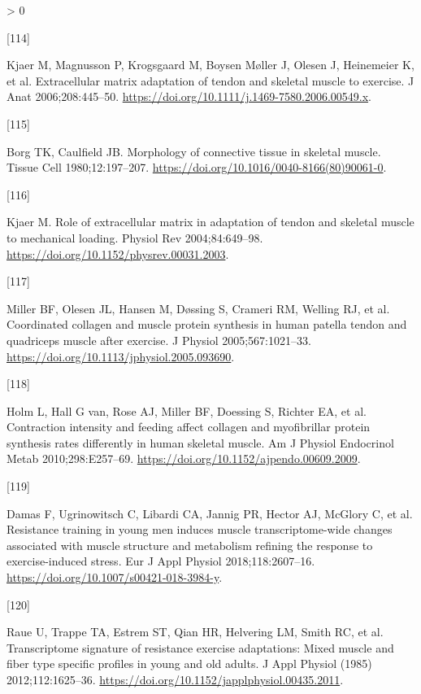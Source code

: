 \documentclass[twoside,10pt]{gihclass} %
\newlength{\cslhangindent}
\newlength{\csllabelwidth}
\newenvironment{CSLReferences}[3] %
 {%
  \setlength{\parindent}{0pt}
  \ifodd #1 \everypar{\setlength{\hangindent}{\cslhangindent}}\ignorespaces\fi
  \ifnum #2 > 0
  \setlength{\parskip}{#2\baselineskip}
  \fi
 }%
 {}
\newcommand{\CSLLeftMargin}[1]{\parbox[t]{\maxof{\widthof{#1}}{\csllabelwidth}}{#1}}
\newcommand{\CSLRightInline}[1]{\parbox[t]{\linewidth}{#1}}
\begin{document}
\begin{CSLReferences}{0}{0}
\leavevmode\hypertarget{ref-RN2770}{}%
\CSLLeftMargin{{[}114{]} }
\CSLRightInline{Kjaer M, Magnusson P, Krogsgaard M, Boysen Møller J, Olesen J, Heinemeier K, et al. Extracellular matrix adaptation of tendon and skeletal muscle to exercise. J Anat 2006;208:445--50. \url{https://doi.org/10.1111/j.1469-7580.2006.00549.x}.}

\leavevmode\hypertarget{ref-RN2783}{}%
\CSLLeftMargin{{[}115{]} }
\CSLRightInline{Borg TK, Caulfield JB. Morphology of connective tissue in skeletal muscle. Tissue Cell 1980;12:197--207. \url{https://doi.org/10.1016/0040-8166(80)90061-0}.}

\leavevmode\hypertarget{ref-RN2421}{}%
\CSLLeftMargin{{[}116{]} }
\CSLRightInline{Kjaer M. Role of extracellular matrix in adaptation of tendon and skeletal muscle to mechanical loading. Physiol Rev 2004;84:649--98. \url{https://doi.org/10.1152/physrev.00031.2003}.}

\leavevmode\hypertarget{ref-RN2788}{}%
\CSLLeftMargin{{[}117{]} }
\CSLRightInline{Miller BF, Olesen JL, Hansen M, Døssing S, Crameri RM, Welling RJ, et al. Coordinated collagen and muscle protein synthesis in human patella tendon and quadriceps muscle after exercise. J Physiol 2005;567:1021--33. \url{https://doi.org/10.1113/jphysiol.2005.093690}.}

\leavevmode\hypertarget{ref-RN2454}{}%
\CSLLeftMargin{{[}118{]} }
\CSLRightInline{Holm L, Hall G van, Rose AJ, Miller BF, Doessing S, Richter EA, et al. Contraction intensity and feeding affect collagen and myofibrillar protein synthesis rates differently in human skeletal muscle. Am J Physiol Endocrinol Metab 2010;298:E257--69. \url{https://doi.org/10.1152/ajpendo.00609.2009}.}

\leavevmode\hypertarget{ref-RN2298}{}%
\CSLLeftMargin{{[}119{]} }
\CSLRightInline{Damas F, Ugrinowitsch C, Libardi CA, Jannig PR, Hector AJ, McGlory C, et al. Resistance training in young men induces muscle transcriptome-wide changes associated with muscle structure and metabolism refining the response to exercise-induced stress. Eur J Appl Physiol 2018;118:2607--16. \url{https://doi.org/10.1007/s00421-018-3984-y}.}

\leavevmode\hypertarget{ref-RN774}{}%
\CSLLeftMargin{{[}120{]} }
\CSLRightInline{Raue U, Trappe TA, Estrem ST, Qian HR, Helvering LM, Smith RC, et al. Transcriptome signature of resistance exercise adaptations: Mixed muscle and fiber type specific profiles in young and old adults. J Appl Physiol (1985) 2012;112:1625--36. \url{https://doi.org/10.1152/japplphysiol.00435.2011}.}


\end{CSLReferences}
\end{document}
